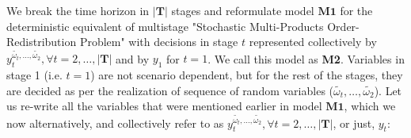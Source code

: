 \documentclass[12pt,a4paper]{article}
\begin{document}
We break the time horizon in $|\textbf{T}|$ stages and reformulate model $\textbf{M1}$ for the deterministic equivalent of multistage "Stochastic Multi-Products Order-Redistribution Problem" with decisions in stage $t$ represented collectively by $y_t^{\tilde{\omega_t},\ldots ,\tilde{\omega_2}}, \forall t=2,\ldots ,|\textbf{T}|$ and by $y_1$ for $t=1$. We call this model as \textbf{M2}. Variables in stage 1 (i.e. $t=1$) are not scenario dependent, but for the rest of the stages, they are decided as per the realization of sequence of random variables ($\tilde{\omega_t},\ldots ,\tilde{\omega_2}$). Let us re-write all the variables that were mentioned earlier in model $\textbf{M1}$, which we now alternatively, and collectively refer to as $y_t^{\tilde{\omega_t},\ldots ,\tilde{\omega_2}}, \forall t=2,\ldots ,|\textbf{T}|$, or just, $y_t$: \\
\end{document}
